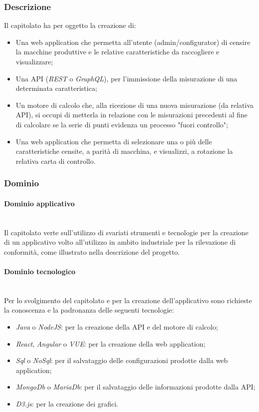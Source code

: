 \documentclass[11pt]{article}
\begin{document}
    \subsubsection{Descrizione}
    Il capitolato ha per oggetto la creazione di: 
	\begin{itemize}
		\item Una web application che permetta all'utente (admin/configurator) di censire la macchine produttive e
		le relative caratteristiche da raccogliere e visualizzare;
		\item Una API (\textit{REST} o \textit{GraphQL}), per l'immissione della misurazione di una determinata
		caratteristica;
		\item Un motore di calcolo che, alla ricezione di una nuova misurazione (da relativa API), si occupi di metterla in
		relazione con le misurazioni precedenti al fine di calcolare se la serie di punti evidenza un processo "fuori controllo";
		\item Una web application che permetta di selezionare una o più delle caratteristiche censite, a parità di macchina,
		e visualizzi, a rotazione la relativa carta di controllo.
	\end{itemize}	    

    \subsubsection{Dominio}
        \paragraph{Dominio applicativo}~\\
        
		\noindent
        Il capitolato verte sull'utilizzo di svariati strumenti e tecnologie per la creazione di un applicativo volto all'utilizzo
        in ambito industriale per la rilevazione di conformità, come illustrato nella descrizione del progetto.
        
        \paragraph{Dominio tecnologico}~\\

		\noindent
        Per lo svolgimento del capitolato e per la creazione dell'applicativo sono richieste la conoscenza e la padronanza delle
        seguenti tecnologie:
        \begin{itemize}
            \item \textit{Java} o \textit{NodeJS}: per la creazione della API e del motore di calcolo;
            \item \textit{React}, \textit{Angular} o \textit{VUE}: per la creazione della web application;
            \item \textit{Sql} o \textit{NoSql}: per il salvataggio delle configurazioni prodotte dalla web application;
            \item \textit{MongoDb} o \textit{MariaDb}: per il salvataggio delle informazioni prodotte dalla API;
            \item \textit{D3.js}: per la creazione dei grafici.
        \end{itemize}
    
\end{document}
